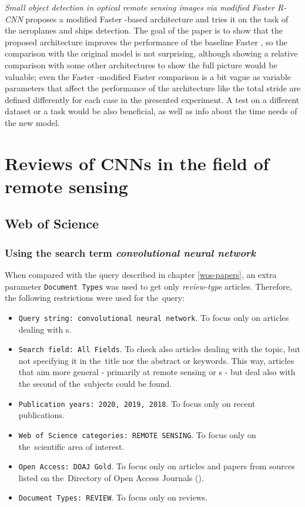 \textit{Small object detection in optical remote sensing images via modified Faster R-CNN} proposes a modified Faster -based architecture and tries it on the task of the aeroplanes and ships detection. The goal of the paper is to show that the proposed architecture improves the performance of the baseline Faster , so the comparison with the original model is not surprising, although showing a relative comparison with some other architectures to show the full picture would be valuable; even the Faster -modified Faster  comparison is a bit vague as variable parameters that affect the performance of the architecture like the total stride are defined differently for each case in the presented experiment. A test on a different dataset or a task would be also beneficial, as well as info about the time needs of the new model.

\section{Reviews of CNNs in the field of remote sensing}
\label{situation}

\subsection{Web of Science}
\label{wos-reviews}

\subsubsection{Using the search term \textit{convolutional neural network}}
\label{wos-reviews-full-length}

When compared with the query described in chapter \ref{wos-papers}, an extra parameter \verb|Document Types| was used to get only \textit{review-type} articles. Therefore, the following restrictions were used for the~query:

\begin{itemize}
	\item \verb|Query string: convolutional neural network|. To focus only on articles dealing with s.
	\item \verb|Search field: All Fields|. To check also articles dealing with the topic, but not specifying it in the~title nor the abstract or keywords. This way, articles that aim more general - primarily at remote sensing or s - but deal also with the second of the~subjects could be found.
	\item \verb|Publication years: 2020, 2019, 2018|. To focus only on recent publications.
	\item \verb|Web of Science categories: REMOTE SENSING|. To focus only on the~scien\-ti\-fic area of interest.
	\item \verb|Open Access: DOAJ Gold|. To focus only on articles and papers from sources listed on the~Di\-rectory of Open Access Journals ().
	\item \verb|Document Types: REVIEW|. To focus only on reviews.
\end{itemize}

